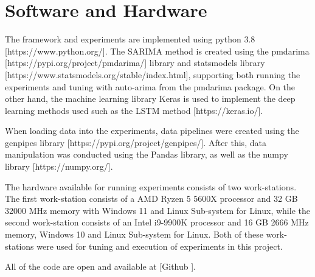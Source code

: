 
\section{Software and Hardware}
\label{section:Method:Hardware&Software}

The framework and experiments are implemented using python 3.8 [https://www.python.org/].
The SARIMA method is created using the pmdarima [https://pypi.org/project/pmdarima/] library and
statsmodels library [https://www.statsmodels.org/stable/index.html],
supporting both running the experiments and tuning with auto-arima from the pmdarima package.
On the other hand, the machine learning library Keras is used to implement the deep learning methods used such as the LSTM method
  [https://keras.io/].

When loading data into the experiments, data pipelines were created using the genpipes library [https://pypi.org/project/genpipes/].
After this, data manipulation was conducted using the Pandas library, as well as the numpy library [https://numpy.org/].

The hardware available for running experiments consists of two work-stations.
The first work-station consists of a AMD Ryzen 5 5600X processor and 32 GB 32000 MHz memory with Windows 11 and Linux Sub-system for Linux,
while the second work-station consists of an Intel i9-9900K processor and 16 GB 2666 MHz memory, Windows 10 and Linux Sub-system for Linux.
Both of these work-stations were used for tuning and execution of experiments in this project.

All of the code are open and available at [Github \cite{githubSource}].

